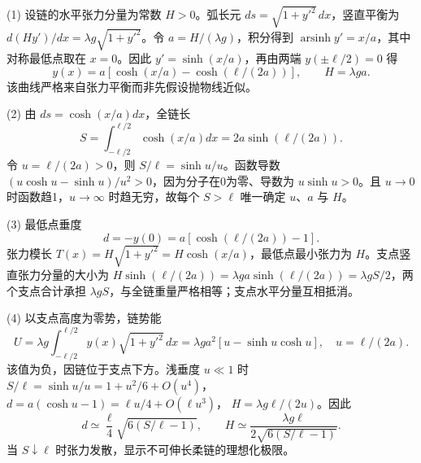 (1) 设链的水平张力分量为常数 \(H>0\)。弧长元 \(ds=\sqrt{1+y'^2}\,dx\)，竖直平衡为 \(d(Hy')/dx=\lambda g\sqrt{1+y'^2}\)。令 \(a=H/(\lambda g)\)，积分得到 \(\operatorname{arsinh}y'=x/a\)，其中对称最低点取在 \(x=0\)。因此 \(y'=\sinh(x/a)\)，再由两端 \(y(\pm\ell/2)=0\) 得
\[
\boxed{y(x)=a[\cosh(x/a)-\cosh(\ell/(2a))]},\qquad H=\lambda ga.
\]
该曲线严格来自张力平衡而非先假设抛物线近似。

(2) 由 \(ds=\cosh(x/a)dx\)，全链长
\[
\boxed{S=\int_{-\ell/2}^{\ell/2}\cosh(x/a)dx=2a\sinh(\ell/(2a))}.
\]
令 \(u=\ell/(2a)>0\)，则 \(S/\ell=\sinh u/u\)。函数导数 \((u\cosh u-\sinh u)/u^2>0\)，因为分子在0为零、导数为 \(u\sinh u>0\)。且 \(u\to0\) 时函数趋1，\(u\to\infty\) 时趋无穷，故每个 \(S>\ell\) 唯一确定 \(u\)、\(a\) 与 \(H\)。

(3) 最低点垂度
\[
d=-y(0)=a[\cosh(\ell/(2a))-1].
\]
张力模长 \(T(x)=H\sqrt{1+y'^2}=H\cosh(x/a)\)，最低点最小张力为 \(H\)。支点竖直张力分量的大小为 \(H\sinh(\ell/(2a))=\lambda g a\sinh(\ell/(2a))=\lambda gS/2\)，两个支点合计承担 \(\lambda gS\)，与全链重量严格相等；支点水平分量互相抵消。

(4) 以支点高度为零势，链势能
\[
U=\lambda g\int_{-\ell/2}^{\ell/2}y(x)\sqrt{1+y'^2}\,dx
=\boxed{\lambda ga^2[u-\sinh u\cosh u]},\quad u=\ell/(2a).
\]
该值为负，因链位于支点下方。浅垂度 \(u\ll1\) 时
\(S/\ell=\sinh u/u=1+u^2/6+O(u^4)\)，
\(d=a(\cosh u-1)=\ell u/4+O(\ell u^3)\)，
\(H=\lambda g\ell/(2u)\)。因此
\[
d\simeq\frac{\ell}{4}\sqrt{6(S/\ell-1)},\qquad
H\simeq\frac{\lambda g\ell}{2\sqrt{6(S/\ell-1)}}.
\]
当 \(S\downarrow\ell\) 时张力发散，显示不可伸长柔链的理想化极限。
